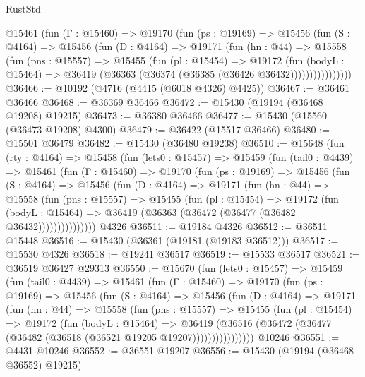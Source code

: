 \begin{lexlean}{RustStd}
\begin{coremodule}
          @15461
            (fun (Γ : @15460) =>
            @19170
              (fun (ps : @19169) =>
              @15456
                (fun (S : @4164) =>
                @15456
                  (fun (D : @4164) =>
                  @19171
                    (fun (hn : @44) =>
                    @15558
                      (fun (pns : @15557) =>
                      @15455
                        (fun (pl : @15454) =>
                        @19172
                          (fun (bodyL : @15464) =>
                          @36419 (@36363 (@36374 (@36385 (@36426 @36432))))))))))))))))
@36466 := @10192 (@4716 (@4415 (@6018 @4326) @4425))
@36467 := @36461 @36466
@36468 := @36369 @36466
@36472 := @15430 (@19194 (@36468 @19208) @19215)
@36473 := @36380 @36466
@36477 := @15430 (@15560 (@36473 @19208) @4300)
@36479 := @36422 (@15517 @36466)
@36480 := @15501 @36479
@36482 := @15430 (@36480 @19238)
@36510 := @15648
    (fun (rty : @4164) =>
    @15458
      (fun (lets0 : @15457) =>
      @15459
        (fun (tail0 : @4439) =>
        @15461
          (fun (Γ : @15460) =>
          @19170
            (fun (ps : @19169) =>
            @15456
              (fun (S : @4164) =>
              @15456
                (fun (D : @4164) =>
                @19171
                  (fun (hn : @44) =>
                  @15558
                    (fun (pns : @15557) =>
                    @15455
                      (fun (pl : @15454) =>
                      @19172
                        (fun (bodyL : @15464) =>
                        @36419 (@36363 (@36472 (@36477 (@36482 @36432)))))))))))))))
    @4326
@36511 := @19184 @4326
@36512 := @36511 @15448
@36516 := @15430 (@36361 (@19181 (@19183 @36512)))
@36517 := @15530 @4326
@36518 := @19241 @36517
@36519 := @15533 @36517
@36521 := @36519 @36427 @29313
@36550 := @15670
    (fun (lets0 : @15457) =>
    @15459
      (fun (tail0 : @4439) =>
      @15461
        (fun (Γ : @15460) =>
        @19170
          (fun (ps : @19169) =>
          @15456
            (fun (S : @4164) =>
            @15456
              (fun (D : @4164) =>
              @19171
                (fun (hn : @44) =>
                @15558
                  (fun (pns : @15557) =>
                  @15455
                    (fun (pl : @15454) =>
                    @19172
                      (fun (bodyL : @15464) =>
                      @36419
                        (@36516
                          (@36472 (@36477 (@36482 (@36518 (@36521 @19205 @19207))))))))))))))))
    @10246
@36551 := @4431 @10246
@36552 := @36551 @19207
@36556 := @15430 (@19194 (@36468 @36552) @19215)

\end{coremodule}
\end{lexlean}
